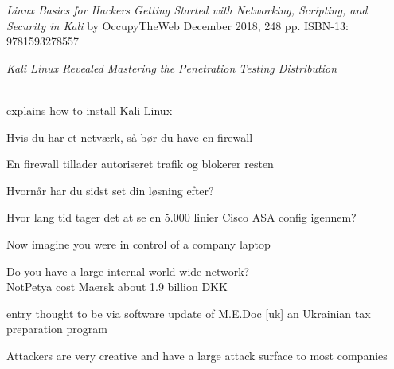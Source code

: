 \documentclass[Screen16to9,17pt]{foils}
\begin{document}


\emph{Linux Basics for Hackers
Getting Started with Networking, Scripting, and Security in Kali}
by OccupyTheWeb
December 2018, 248 pp.
ISBN-13:
9781593278557




\emph{Kali Linux Revealed  Mastering the Penetration Testing Distribution}

\\
explains how to install Kali Linux



\begin{list2}
\item Hvis du har et netværk, så bør du have en firewall
\item En firewall tillader autoriseret trafik og blokerer resten
\item Hvornår har du sidst set din løsning efter?
\item Hvor lang tid tager det at se en 5.000 linier Cisco ASA config igennem?
\end{list2}



\begin{list2}
\item Now imagine you were in control of a company laptop
\item Do you have a large internal world wide network?\\
NotPetya cost Maersk about 1.9 billion DKK

\item entry thought to be via software update of M.E.Doc [uk] an Ukrainian tax preparation program
\item Attackers are very creative and have a large attack surface to most companies
\end{list2}
\end{document}
